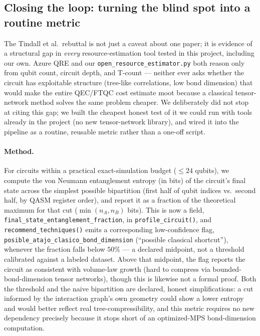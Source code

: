 \documentclass[9pt,twocolumn]{extarticle}
\begin{document}
\subsection{Closing the loop: turning the blind spot into a routine metric}
\label{sec:entanglement-metric}
The Tindall et al.\ rebuttal is not just a caveat about one paper; it is
evidence of a structural gap in \emph{every} resource-estimation tool
tested in this project, including our own. Azure QRE and our
\texttt{open\_resource\_estimator.py} both reason only from qubit count,
circuit depth, and T-count --- neither ever asks whether the circuit has
exploitable structure (tree-like correlations, low bond dimension) that
would make the entire QEC/FTQC cost estimate moot because a classical
tensor-network method solves the same problem cheaper. We deliberately did
not stop at citing this gap; we built the cheapest honest test of it we
could run with tools already in the project (no new tensor-network
library), and wired it into the pipeline as a routine, reusable metric
rather than a one-off script.

\paragraph{Method.} For circuits within a practical exact-simulation budget
($\leq 24$ qubits), we compute the von Neumann entanglement entropy (in
bits) of the circuit's final state across the simplest possible
bipartition (first half of qubit indices vs.\ second half, by QASM
register order), and report it as a fraction of the theoretical maximum
for that cut ($\min(n_A, n_B)$ bits). This is now a field,
\texttt{final\_state\_entanglement\_fraction}, in \texttt{profile\_circuit()},
and \texttt{recommend\_techniques()} emits a corresponding
low-confidence flag, \texttt{posible\_atajo\_clasico\_bond\_dimension}
(``possible classical shortcut''), whenever the fraction falls below
$50\%$ --- a declared midpoint, not a threshold calibrated against a
labeled dataset. Above that midpoint, the flag reports the circuit as
consistent with volume-law growth (hard to compress via bounded-bond-dimension
tensor networks), though this is likewise not a formal proof. Both the
threshold and the naive bipartition are declared, honest simplifications:
a cut informed by the interaction graph's own geometry could show a lower
entropy and would better reflect real tree-compressibility, and this
metric requires no new dependency precisely because it stops short of an
optimized-MPS bond-dimension computation.
\end{document}
